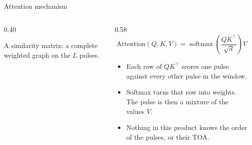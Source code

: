 \documentclass[aspectratio=169,10pt]{beamer}
\DeclareMathOperator{\softmax}{softmax}
\begin{document}
\begin{frame}{Attention mechanism}
  \begin{columns}[c,onlytextwidth]
    \begin{column}{0.40\textwidth}
      \centering

      \vspace{0.6em}
      {\footnotesize A similarity matrix: a complete weighted graph on the \(L\) pulses.}
    \end{column}
    \begin{column}{0.58\textwidth}
      \[
        \mathrm{Attention}(Q,K,V)
        = \softmax\!\left(\frac{QK^{\top}}{\sqrt{d}}\right) V
      \]
      \begin{itemize}
        \item Each row of \(QK^{\top}\) scores one pulse against every other pulse in the window.
        \item Softmax turns that row into weights. The pulse is then a mixture of the values \(V\).
        \item Nothing in this product knows the order of the pulses, or their TOA.
      \end{itemize}
    \end{column}
  \end{columns}
\end{frame}
\end{document}
